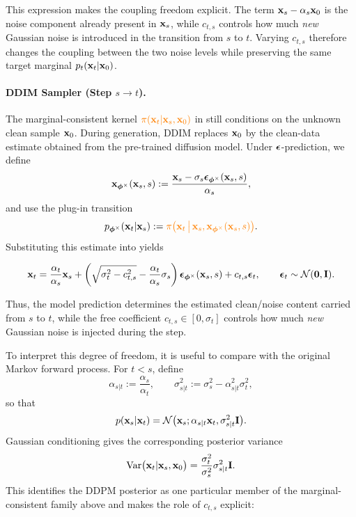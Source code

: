 This expression makes the coupling freedom explicit. The term
${\mathbf{x}}_s-\alpha_s{\mathbf{x}}_0$ is the noise component already present in
${\mathbf{x}}_s$, while $c_{t,s}$ controls how much \emph{new} Gaussian noise is
introduced in the transition from $s$ to $t$. Varying $c_{t,s}$ therefore
changes the coupling between the two noise levels while preserving the same
target marginal $p_t({\mathbf{x}}_t|{\mathbf{x}}_0)$.



\paragraph{DDIM Sampler (Step $s\to t$).}
The marginal-consistent kernel
${\color{orange}\pi({\mathbf{x}}_t|{\mathbf{x}}_s,{\mathbf{x}}_0)}$ in
 still conditions on the unknown clean
sample ${\mathbf{x}}_0$. During generation, DDIM replaces ${\mathbf{x}}_0$ by the clean-data
estimate obtained from the pre-trained diffusion model. Under
${\bm{\epsilon}}$-prediction, we define
\[
{\mathbf{x}}_{\bm{\phi}^\times}({\mathbf{x}}_s,s)
:=
\frac{
{\mathbf{x}}_s
-
\sigma_s{\bm{\epsilon}}_{\bm{\phi}^\times}({\mathbf{x}}_s,s)
}{
\alpha_s
},
\]
and use the plug-in transition
\[
p_{\bm{\phi}^\times}({\mathbf{x}}_t|{\mathbf{x}}_s)
:=
{\color{orange}\pi
\bigl(
{\mathbf{x}}_t
\,\big|\,
{\mathbf{x}}_s,
{\mathbf{x}}_{\bm{\phi}^\times}({\mathbf{x}}_s,s)
\bigr)}.
\]
Substituting this estimate into
 yields
\begin{mdframed}
\[
{\mathbf{x}}_t
=
\frac{\alpha_t}{\alpha_s}{\mathbf{x}}_s
+
\left(
\sqrt{\sigma_t^2-c_{t,s}^2}
-
\frac{\alpha_t}{\alpha_s}\sigma_s
\right)
{\bm{\epsilon}}_{\bm{\phi}^\times}({\mathbf{x}}_s,s)
+
c_{t,s}{\bm{\epsilon}}_t,
\qquad
{\bm{\epsilon}}_t\sim\mathcal{N}(\mathbf{0},\mathbf{I}).
\]
\end{mdframed}
Thus, the model prediction determines the estimated clean/noise content
carried from $s$ to $t$, while the free coefficient
$c_{t,s}\in[0,\sigma_t]$ controls how much \emph{new} Gaussian noise is
injected during the step.

To interpret this degree of freedom, it is useful to compare with the
original Markov forward process. For $t<s$, define
\[
\alpha_{s|t}
:=
\frac{\alpha_s}{\alpha_t},
\qquad
\sigma_{s|t}^2
:=
\sigma_s^2-\alpha_{s|t}^2\sigma_t^2,
\]
so that
\[
p({\mathbf{x}}_s|{\mathbf{x}}_t)
=
\mathcal{N}
\bigl(
{\mathbf{x}}_s;
\alpha_{s|t}{\mathbf{x}}_t,
\sigma_{s|t}^2\mathbf I
\bigr).
\]
Gaussian conditioning gives the corresponding posterior variance
\[
\operatorname{Var}
\bigl(
{\mathbf{x}}_t|{\mathbf{x}}_s,{\mathbf{x}}_0
\bigr)
=
\frac{\sigma_t^2}{\sigma_s^2}
\sigma_{s|t}^2\mathbf I.
\]
This identifies the DDPM posterior as one particular member of the
marginal-consistent family above and makes the role of $c_{t,s}$ explicit:

